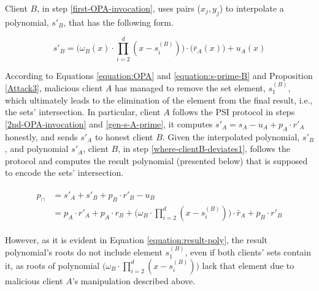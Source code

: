 Client $B$, in step \ref{first-OPA-invocation}, uses pairs ($x_{\scriptscriptstyle j},y_{\scriptscriptstyle j}$) to interpolate a polynomial, $s'_{\scriptscriptstyle B}$, that has the following form.

\begin{equation}\label{equation:s-prime-B}
s'_{\scriptscriptstyle B}={\Big(\omega_{\scriptscriptstyle B}(x)\cdot \prod\limits^{\scriptscriptstyle d}_{\scriptscriptstyle i=2}(x-s^{\scriptscriptstyle(B)}_{\scriptscriptstyle i})\Big)}\cdot \Big(\bar{r}_{\scriptscriptstyle A}(x)\Big)+u_{\scriptscriptstyle A}(x)
\end{equation}


 According to Equations \ref{equation:OPA} and \ref{equation:s-prime-B}  and  Proposition \ref{Attack3},  malicious client $A$ has managed to remove the set element, $s^{\scriptscriptstyle(B)}_{\scriptscriptstyle 1}$, which ultimately leads to the elimination of the element from the final result, i.e., the sets' intersection. In particular, client $A$ follows the PSI protocol in steps \ref{2nd-OPA-invocation} and \ref{gen-s-A-prime}, it  computes $s'_{\scriptscriptstyle A}=s_{\scriptscriptstyle A}-u_{\scriptscriptstyle A}+p_{\scriptscriptstyle A}\cdot r'_{\scriptscriptstyle A}$ honestly, and sends $s'_{\scriptscriptstyle A}$ to honest client $B$.  Given the interpolated polynomial, $s'_{\scriptscriptstyle B}$, and  polynomial $s'_{\scriptscriptstyle A}$,  client $B$, in step \ref{where-clientB-deviates1}, follows the protocol and computes the result  polynomial (presented below) that is supposed to encode the sets' intersection. 
  
  
  

  \begin{align}\label{equation:result-poly}
  \begin{split}
  p_{\scriptscriptstyle \cap}&=s'_{\scriptscriptstyle A}+s'_{\scriptscriptstyle B}+p_{\scriptscriptstyle B}\cdot r'_{\scriptscriptstyle B}-u_{\scriptscriptstyle B}\\
  &=p_{\scriptscriptstyle A}\cdot r'_{\scriptscriptstyle A}+p_{\scriptscriptstyle A}\cdot r_{\scriptscriptstyle B}+{\Big(\omega_{\scriptscriptstyle B}\cdot \prod\limits^{\scriptscriptstyle d}_{\scriptscriptstyle i=2}(x-s^{\scriptscriptstyle(B)}_{\scriptscriptstyle i})\Big)}\cdot \bar{r}_{\scriptscriptstyle A}+p_{\scriptscriptstyle B}\cdot r'_{\scriptscriptstyle B}
    \end{split}
  \end{align}

  However, as it is evident in Equation \ref{equation:result-poly}, the result polynomial's roots do not include element $s^{\scriptscriptstyle(B)}_{\scriptscriptstyle 1}$, even if both clients' sets contain it, as roots of polynomial $\Big(\omega_{\scriptscriptstyle B}\cdot \prod\limits^{\scriptscriptstyle d}_{\scriptscriptstyle i=2}(x-s^{\scriptscriptstyle(B)}_{\scriptscriptstyle i})\Big)$ lack that element due to  malicious client $A$'s manipulation described above.  
  
